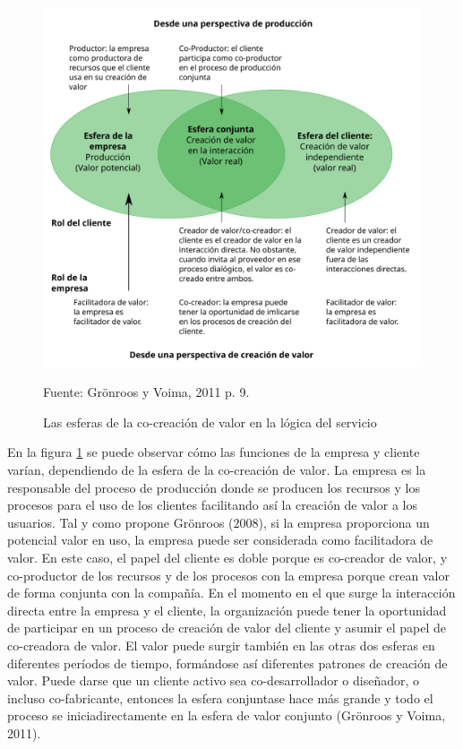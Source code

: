 \begin{figure}[!h]
	\caption{Las esferas de la co-creación de valor en la lógica del servicio}
	\centering \includegraphics[width=140mm]{capitulos/graficos/esferasGronroos} 
	\label{fig:esferasGronroos} 

	\footnotesize
		Fuente: Grönroos y Voima, 2011 p. 9.
\end{figure}

En la figura \ref{fig:esferasGronroos} se puede observar cómo las funciones de la empresa y cliente varían, dependiendo de la esfera de la co-creación de valor. La empresa es la responsable del proceso de producción donde se producen los recursos y los procesos para el uso de los clientes facilitando así la creación de valor a los usuarios. Tal y como propone Grönroos (2008), si la empresa proporciona un potencial valor en uso, la empresa puede ser considerada como facilitadora de valor. En este caso, el papel del cliente es doble porque es co-creador de valor, y co-productor de los recursos y de los procesos con la empresa porque crean valor de forma conjunta con la compañía. En el momento en el que surge la interacción directa entre la empresa y el cliente, la organización puede tener la oportunidad de participar en un proceso de creación de valor del cliente y asumir el papel de co-creadora de valor. El valor puede surgir también en las otras dos esferas en diferentes períodos de tiempo, formándose así diferentes patrones de creación de valor. Puede darse que un cliente activo sea co-desarrollador o diseñador, o incluso co-fabricante, entonces la esfera conjuntase hace más grande y todo el proceso se iniciadirectamente en la esfera de valor conjunto (Grönroos y Voima, 2011).

